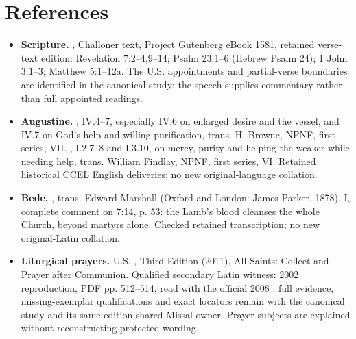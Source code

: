 \section{References}
\begin{itemize}[leftmargin=1.3em,itemsep=.4em]
\item \textbf{Scripture.} , Challoner text, Project Gutenberg eBook 1581, retained verse-text edition: Revelation 7:2--4,9--14; Psalm 23:1--6 (Hebrew Psalm 24); 1 John 3:1--3; Matthew 5:1--12a. The U.S. appointments and partial-verse boundaries are identified in the canonical study; the speech supplies commentary rather than full appointed readings.
\item \textbf{Augustine.} , IV.4--7, especially IV.6 on enlarged desire and the vessel, and IV.7 on God's help and willing purification, trans. H. Browne, NPNF, first series, VII. , I.2.7--8 and I.3.10, on mercy, purity and helping the weaker while needing help, trans. William Findlay, NPNF, first series, VI. Retained historical CCEL English deliveries; no new original-language collation.
\item \textbf{Bede.} , trans. Edward Marshall (Oxford and London: James Parker, 1878), I, complete comment on 7:14, p. 53: the Lamb's blood cleanses the whole Church, beyond martyrs alone. Checked retained transcription; no new original-Latin collation.
\item \textbf{Liturgical prayers.} U.S. , Third Edition (2011), All Saints: Collect and Prayer after Communion. Qualified secondary Latin witness: 2002 reproduction, PDF pp. 512--514, read with the official 2008 ; full evidence, missing-exemplar qualifications and exact locators remain with the canonical study and its same-edition shared Missal owner. Prayer subjects are explained without reconstructing protected wording.
\end{itemize}
